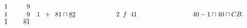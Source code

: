 $\protect\begin{array}{l}1\\1\\\overline{1} \protect\end{array}\hspace{5mm} \protect\begin{array}{r}9\\9\\\overline{81} \protect\end{array}\\
\vspace{2mm}\rule{2mm}{0mm} 1 \hspace{5.5pt} + \hspace{5.5pt} 81 \sqcap \underline{82}\\
\rule{22mm}{0mm}2 \hspace{5.5pt} f \hspace{5.5pt} 41\\
\rule{30mm}{0mm} 40 - 1 \sqcap 40 \sqcap CB.$
\pend 